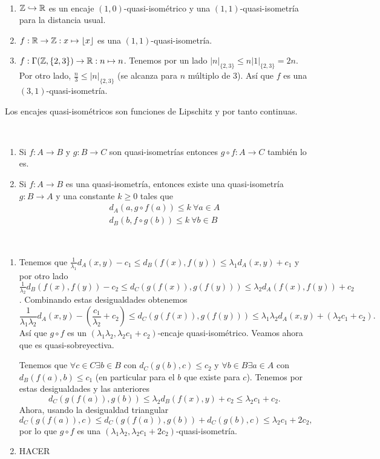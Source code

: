 \documentclass[twoside, 11pt]{article}
\begin{document}
\begin{ejs}\
\begin{enumerate}
\item $\mathbb{Z}\hookrightarrow\mathbb{R}$ es un encaje $(1,0)$-quasi-isométrico y una $(1,1)$-quasi-isometría para la distancia usual.
\item $f:\mathbb{R}\to\mathbb{Z}:x\mapsto\lfloor x\rfloor$ es una $(1,1)$-quasi-isometría.
\item $f:\Gamma(\mathbb{Z},\{2,3\})\to \mathbb{R}: n\mapsto n$. Tenemos por un lado $|n|_{\{2,3\}}\leq n|1|_{\{2,3\}}=2n$. Por otro lado, $\frac{n}{3}\leq |n|_{\{2,3\}}$ (se alcanza para $n$ múltiplo de 3). Así que $f$ es una $(3,1)$-quasi-isometría. 
\end{enumerate}
\end{ejs}

\begin{observacion}
Los encajes quasi-isométricos son funciones de Lipschitz y por tanto continuas.
\end{observacion}

\begin{prop}\
\begin{enumerate}
\item Si $f:A\to B$ y $g:B\to C$ son quasi-isometrías entonces $g\circ f:A\to C$ también lo es.
\item Si $f:A\to B$ es una quasi-isometría, entonces existe una quasi-isometría $g:B\to A$ y una constante $k\geq 0$ tales que
\begin{align*}
d_A(a,g\circ f(a))\leq k \ \forall a\in A\\
d_B(b,f\circ g(b))\leq k \ \forall b\in B
\end{align*}
\end{enumerate}
\end{prop}
\begin{dem}\
\begin{enumerate}
\item Tenemos que $\frac{1}{\lambda_1}d_A(x,y)-c_1\leq d_B(f(x),f(y))\leq\lambda_1 d_A(x,y)+c_1$ y por otro lado $\frac{1}{\lambda_2}d_B(f(x),f(y))-c_2\leq d_C(g(f(x)),g(f(y)))\leq\lambda_2 d_A(f(x),f(y))+c_2$. Combinando estas desigualdades obtenemos
\[
\frac{1}{\lambda_1\lambda_2}d_A(x,y)-\left(\frac{c_1}{\lambda_2}+c_2\right)\leq d_C(g(f(x)),g(f(y)))\leq \lambda_1\lambda_2 d_A(x,y)+(\lambda_2 c_1+c_2).
\]
Así que $g\circ f$ es un $(\lambda_1\lambda_2, \lambda_2 c_1+c_2)$-encaje quasi-isométrico. Veamos ahora que es quasi-sobreyectiva. 

Tenemos que $\forall c\in C\exists b\in B$ con $d_C(g(b),c)\leq c_2$ y $\forall b\in B\exists a\in A$ con $d_B(f(a),b)\leq c_1$ (en particular para el $b$ que existe para $c$). Tenemos por estas desigualdades y las anteriores 
\[
d_C(g(f(a)),g(b))\leq \lambda_2 d_B(f(x),y)+c_2\leq \lambda_2 c_1+c_2.
\]
Ahora, usando la desigualdad triangular
\[
d_C(g(f(a)),c)\leq d_C(g(f(a)),g(b))+d_C(g(b),c)\leq \lambda_2c_1 +2c_2,
\]
por lo que $g\circ f$ es una $(\lambda_1\lambda_2, \lambda_2c_1 +2c_2)$-quasi-isometría. 
\item HACER 
\end{enumerate}
\QED
\end{dem}
\end{document}
